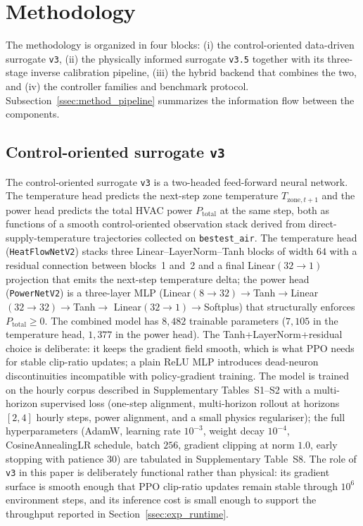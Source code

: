 \section{Methodology}
\label{sec:methodology}

The methodology is organized in four blocks: (i) the control-oriented
data-driven surrogate \texttt{v3}, (ii) the physically informed surrogate
\texttt{v3.5} together with its three-stage inverse calibration pipeline,
(iii) the hybrid backend that combines the two, and (iv) the controller
families and benchmark protocol. Subsection~\ref{ssec:method_pipeline}
summarizes the information flow between the components.

\subsection{Control-oriented surrogate \texttt{v3}}
\label{ssec:method_v3}

The control-oriented surrogate \texttt{v3} is a two-headed feed-forward
neural network. The temperature head predicts the next-step zone
temperature $T_{\mathrm{zone},t+1}$ and the power head predicts the
total HVAC power $P_{\mathrm{total}}$ at the same step, both as
functions of a smooth control-oriented observation stack derived from
direct-supply-temperature trajectories collected on \boptest{}
\texttt{bestest\_air}. The temperature head (\texttt{HeatFlowNetV2})
stacks three Linear--LayerNorm--Tanh blocks of width $64$ with a
residual connection between blocks~1 and~2 and a final
Linear$(32{\to}1)$ projection that emits the next-step temperature
delta; the power head (\texttt{PowerNetV2}) is a three-layer MLP
(Linear$(8{\to}32)\to$Tanh$\to$Linear$(32{\to}32)\to$Tanh$\to$
Linear$(32{\to}1)\to$Softplus) that structurally enforces
$P_{\mathrm{total}}\geq 0$. The combined model has $8{,}482$ trainable
parameters ($7{,}105$ in the temperature head, $1{,}377$ in the power
head). The Tanh+LayerNorm+residual choice is deliberate: it keeps the
gradient field smooth, which is what PPO needs for stable
clip-ratio updates; a plain ReLU MLP introduces dead-neuron
discontinuities incompatible with policy-gradient training. The model
is trained on the hourly corpus described in Supplementary
Tables~S1--S2 with a multi-horizon supervised loss (one-step
alignment, multi-horizon rollout at horizons $[2,4]$ hourly steps,
power alignment, and a small physics regulariser); the full
hyperparameters (AdamW, learning rate $10^{-3}$, weight decay
$10^{-4}$, CosineAnnealingLR schedule, batch $256$, gradient clipping
at norm $1.0$, early stopping with patience $30$) are tabulated in
Supplementary Table~S8. The role
of \texttt{v3} in this paper is deliberately functional rather than
physical: its gradient surface is smooth enough that PPO clip-ratio
updates remain stable through $10^{6}$ environment steps, and its
inference cost is small enough to support the throughput reported in
Section~\ref{ssec:exp_runtime}.

